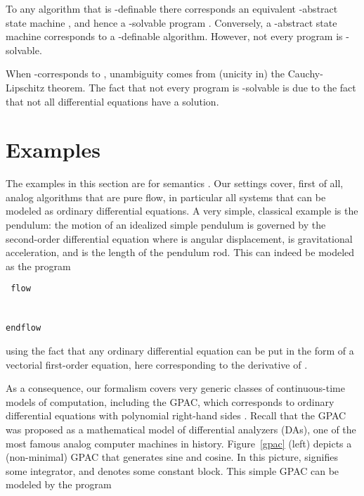 \documentclass[envcountsame]{llncs}
\newenvironment{ttcode}{\begin{ttfamily}\rm\tt}{\end{ttfamily}}
\newcommand\s{\phantom{x}}
\begin{document}
To any algorithm  that is -definable there corresponds an
    equivalent -abstract state machine , and hence a
    -solvable program . Conversely, a -abstract state
    machine  corresponds to a -definable algorithm.
However, not every program  is -solvable.

When -corresponds to , unambiguity comes from
(unicity in)
the Cauchy-Lipschitz theorem.  The fact that
    not every program  is -solvable is due to the fact that
    not all differential equations have a solution.







\section{Examples}


The examples in this section are for semantics .
Our settings cover, first of all, analog algorithms that are  pure flow, in particular all systems that can be modeled as ordinary differential equations.
A very simple, classical example is the pendulum: the motion of an idealized simple pendulum is governed by the second-order
differential equation 
where
 is angular displacement,  is gravitational acceleration,
and  is the length of the pendulum rod.
This can indeed be modeled as the program

 \begin{center}
  \begin{minipage}{8cm}
\begin{ttcode}
flow \\
 \s   \\
\s   \\
endflow
\end{ttcode}
   \end{minipage}
  \end{center}

\noindent
using the fact that any ordinary differential equation can be put in the form of a vectorial first-order equation, here  corresponding to the derivative of .

As a consequence, our formalism covers very generic classes of continuous-time models of computation, including the GPAC, which corresponds to ordinary differential equations with polynomial right-hand sides \cite{GC03,GBC09}.
Recall that the GPAC was proposed as a mathematical model of
differential analyzers (DAs), one of the most famous analog computer
machines in history.  Figure~\ref{gpac} (left) depicts a (non-minimal) GPAC that generates sine and cosine.
In this
picture,   signifies  some integrator, and   denotes
some constant block.
This simple GPAC can be modeled by the program
\end{document}
